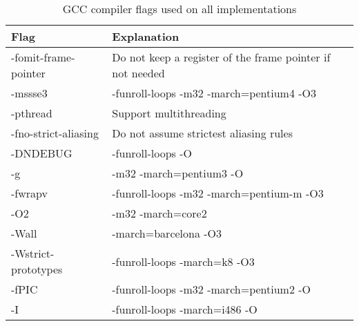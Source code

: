 \begin{table}
  \centering
  \begin{tabular}{ | l | l | }
    \hline
    \textbf{Flag} & \textbf{Explanation}            \\ \hline
     -fomit-frame-pointer   & Do not keep a register of the frame pointer if
     not needed      \\ \hline
     -mssse3                & -funroll-loops -m32 -march=pentium4 -O3  \\ \hline
     -pthread               & Support multithreading                   \\ \hline
     -fno-strict-aliasing   & Do not assume strictest aliasing rules   \\ \hline
     -DNDEBUG               & -funroll-loops -O                        \\ \hline
     -g                     & -m32 -march=pentium3 -O                  \\ \hline
     -fwrapv                & -funroll-loops -m32 -march=pentium-m -O3 \\ \hline
     -O2                    & -m32 -march=core2                        \\ \hline
     -Wall                  & -march=barcelona -O3                     \\ \hline
     -Wstrict-prototypes    & -funroll-loops -march=k8 -O3             \\ \hline
     -fPIC                  & -funroll-loops -m32 -march=pentium2 -O   \\ \hline
     -I                     & -funroll-loops -march=i486 -O            \\ \hline
  \end{tabular}
  \caption{GCC compiler flags used on all implementations}
  \label{tbl:sha3:compilerflags}
\end{table}
